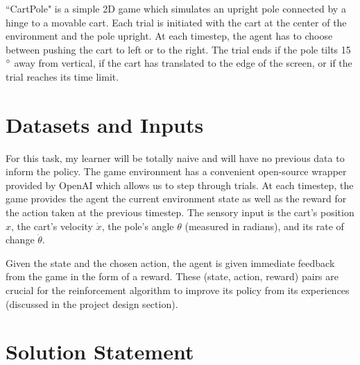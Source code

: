 \documentclass[12pt,a4paper]{article}
\begin{document}
``CartPole" is a simple 2D game which simulates an upright pole connected by a hinge to a movable cart.\cite{cartpole} Each trial is initiated with the cart at the center of the environment and the pole upright. At each timestep, the agent has to choose between pushing the cart to left or to the right. The trial ends if the pole tilts 15$\degree$ away from vertical, if the cart has translated to the edge of the screen, or if the trial reaches its time limit.

\section*{Datasets and Inputs}
%
%
For this task, my learner will be totally naive and will have no previous data to inform the policy. The game environment has a convenient open-source wrapper provided by OpenAI which allows us to step through trials.\cite{cartpole} At each timestep, the game provides the agent the current environment state as well as the reward for the action taken at the previous timestep.  The sensory input is the cart's position $x$, the cart's velocity $\dot x$, the pole's angle $\theta$ (measured in radians), and its rate of change $\dot\theta$.\cite{state_def} 

Given the state and the chosen action, the agent is given immediate feedback from the game in the form of a reward. These (state, action, reward) pairs are crucial for the reinforcement algorithm to improve its policy from its experiences (discussed in the project design section).

\section*{Solution Statement}
%
\end{document}
